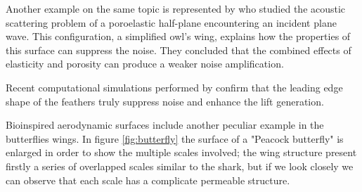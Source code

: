 Another example on the same topic is represented by \citet{jaworski2013aerodynamic} who studied the acoustic scattering problem of a poroelastic half-plane encountering an incident plane wave.
This configuration, a simplified owl's wing, explains how the properties of this surface can suppress the noise.
They concluded that the combined effects of elasticity and porosity can produce a weaker noise amplification.

Recent computational simulations performed by \citet{rao2017owl} confirm that the leading edge shape of the feathers truly suppress noise and enhance the lift generation.

Bioinspired aerodynamic surfaces include another peculiar example in the butterflies wings.
In figure \ref{fig:butterfly} the surface of a "Peacock butterfly" is enlarged in order to show the multiple scales involved; the wing structure present firstly a series of overlapped scales similar to the shark, but if we look closely we can observe that each scale has a complicate permeable structure.

